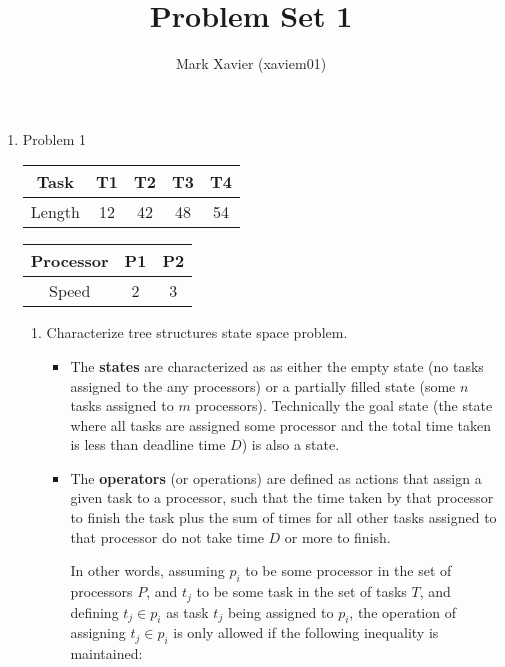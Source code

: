 \documentclass{article}
\title{Problem Set 1}
\author{Mark Xavier (xaviem01)}
\begin{document}
	\maketitle
	
	\begin{enumerate}
		\item Problem 1
		
			\begin{center}
				\begin{tabular}{|c|c|c|c|c|}
					\hline
					Task & T1 & T2 & T3 & T4 \\
					\hline
					Length & 12 & 42 & 48 & 54 \\
					\hline
				\end{tabular}
			
				\begin{tabular}{|c|c|c|}
					\hline
					Processor & P1 & P2 \\
					\hline
					Speed & 2 & 3 \\
					\hline
				\end{tabular}
			\end{center}
		
			\begin{enumerate}
				\item Characterize tree structures state space problem.
				
				\begin{itemize}
					\item The \textbf{states} are characterized as as either the empty state (no tasks assigned to the any processors) or a partially filled state (some $n$ tasks assigned to $m$ processors).  Technically the goal state (the state where all tasks are assigned some processor and the total time taken is less than deadline time $D$) is also a state. 
					
					\item The \textbf{operators} (or operations) are defined as actions that assign a given task to a processor, such that the time taken by that processor to finish the task plus the sum of times for all other tasks assigned to that processor do not take time $D$ or more to finish.
					
					In other words, assuming $p_i$ to be some processor in the set of processors $P$, and $t_j$ to be some task in the set of tasks $T$, and defining $t_j \in p_i$ as task $t_j$ being assigned to $p_i$, the operation of assigning $t_j \in p_i$ is only allowed if the following inequality is maintained:
					

\end{itemize}
\end{enumerate}
\end{enumerate}
\end{document}
